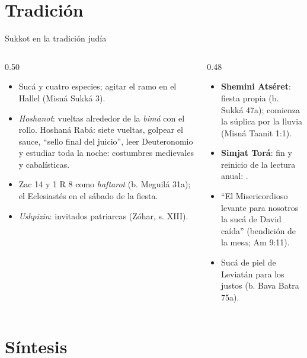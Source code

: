 \section{Tradición}

\begin{frame}{Sukkot en la tradición judía}
\begin{columns}[t,onlytextwidth]
\begin{column}{0.50\textwidth}\scriptsize
\begin{itemize}
\item Sucá y cuatro especies; agitar el ramo en el Hallel (Misná Sukká 3).
\item \emph{Hoshanot}: vueltas alrededor de la \emph{bimá} con el rollo. Hoshaná Rabá: siete vueltas, golpear el sauce, ``sello final del juicio'', leer Deuteronomio y estudiar toda la noche: costumbres medievales y cabalísticas.
\item Zac 14 y 1 R 8 como \emph{haftarot} (b. Meguilá 31a); el Eclesiastés en el sábado de la fiesta.
\item \emph{Ushpizin}: invitados patriarcas (Zóhar, s. XIII).
\end{itemize}
\end{column}
\begin{column}{0.48\textwidth}\scriptsize
\begin{itemize}
\item \textbf{Shemini Atséret}: fiesta propia (b. Sukká 47a); comienza la súplica por la lluvia (Misná Taanit 1:1).
\item \textbf{Simjat Torá}: fin y reinicio de la lectura anual: .
\item ``El Misericordioso levante para nosotros la sucá de David caída'' (bendición de la mesa; Am 9:11).
\item Sucá de piel de Leviatán para los justos (b. Bava Batra 75a).
\end{itemize}
\end{column}
\end{columns}\par\medskip
{}
\end{frame}

\section{Síntesis}


